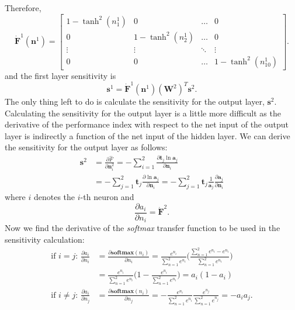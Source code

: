 \documentclass[12pt,halfline,a4paper]{ouparticle}
\begin{document}
Therefore, 
\begin{equation}
\dot{\mathbf{F}}^{1}(\mathbf{n}^{1}) = \begin{bmatrix} 1 - \tanh^{2}(n_{1}^{1}) & 0 & \ldots & 0 \\ 
0 & 1 - \tanh^{2}(n_{2}^{1}) & \ldots & 0 \\
\vdots & \vdots & \ddots & \vdots \\ 
0 & 0 & \ldots & 1 - \tanh^{2}(n_{10}^{1}) \end{bmatrix}.
\end{equation}
and the first layer sensitivity is 
\begin{equation}
\mathbf{s}^{1} = \dot{\mathbf{F}}^{1}(\mathbf{n}^{1})(\mathbf{W}^{2})^{T}\mathbf{s}^{2}.
\end{equation}
The only thing left to do is calculate the sensitivity for the output layer, $\mathbf{s}^{2}$. Calculating the sensitivity for the output layer is a little more difficult as the derivative of the performance index with respect to the net input of the output layer is indirectly a function of the net input of the hidden layer. We can derive the sensitivity for the output layer as follows: 
\begin{equation}
\begin{split}
\mathbf{s}^{2} & = \frac{\partial \hat{F}}{\partial \mathbf{n}_{i}^{2}} = - \sum_{i = 1}^{2} \frac{\partial \mathbf{t}_{j} \ln \mathbf{a}_{j}}{\partial \mathbf{n}_{i}} \\
& = - \sum_{j = 1}^{2} \mathbf{t}_{j} \frac{\partial \ln \mathbf{a}_{j}}{\partial \mathbf{n}_{i}} = - \sum_{j = 1}^{2} \mathbf{t}_{j} \frac{1}{\mathbf{a}_{j}} \frac{\partial \mathbf{a}_{j}}{\partial \mathbf{n}_{i}}
\end{split}
\end{equation}
where $i$ denotes the $i$-th neuron and 
\begin{equation}
\frac{\partial a_{i}}{\partial n_{i}} = \dot{\mathbf{F}}^{2}.
\end{equation}
Now we find the derivative of the \emph{softmax} transfer function to be used in the sensitivity calculation: 
\begin{equation}
\begin{split}
\text{if } i = j \text{: } \frac{\partial a_{i}}{\partial n_{i}} & = \frac{\partial \textbf{softmax}(n_{i})}{\partial n_{i}} = \frac{e^{n_{i}}}{\sum_{n = 1}^{2} e^{n_{i}}} \bigg(\frac{\sum_{n = 1}^{2} e^{n_{i}} - e^{n_{i}}}{\sum_{n = 1}^{2} e^{n_{i}}}\bigg) \\
& = \frac{e^{n_{i}}}{\sum_{n = 1}^{2} e^{n_{i}}}\bigg(1 - \frac{e^{n_{i}}}{\sum_{n = 1}^{2} e^{n_{i}}}\bigg) = a_{i}(1 - a_{i}) \\
\text{if } i \neq j \text{: } \frac{\partial a_{i}}{\partial n_{j}} & = \frac{\partial \textbf{softmax}(n_{i})}{\partial n_{j}} = - \frac{e^{n_{i}}}{\sum_{n = 1}^{2} e^{n_{i}}} \frac{e^{n_{j}}}{\sum_{n = 1}^{2} e^{n_{j}}} = -a_{i}a_{j}.
\end{split}
\end{equation}
\end{document}
